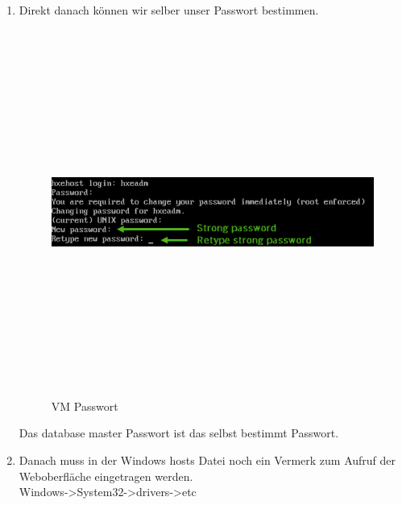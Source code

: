 \documentclass[a4paper, 12pt]{scrartcl}
\begin{document}
\begin{description}
\begin{enumerate}
      \item Direkt danach können wir selber unser Passwort bestimmen.
      
\begin{figure}[H]
\centering
\includegraphics[height=12cm, width=15cm, keepaspectratio]{Hana4.png}
\caption{VM Passwort}
\end{figure}

      Das database master Passwort ist das selbst bestimmt Passwort.
      \item Danach muss in der Windows hosts Datei noch ein Vermerk zum Aufruf der Weboberfläche eingetragen werden. \\Windows->System32->drivers->etc


\end{enumerate}
\end{description}
\end{document}
